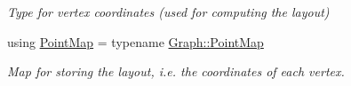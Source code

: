 \begin{DoxyCompactItemize}
\begin{DoxyCompactList}\small\item\em Type for vertex coordinates (used for computing the layout) \end{DoxyCompactList}\item 
using \hyperlink{structDrawer_aab5295b2d9eedf3bab3cb4829cdcfb11}{Point\+Map} = typename \hyperlink{structStateGraph_a21b31bbe893554826be5aee67ef0cab9}{Graph\+::\+Point\+Map}\hypertarget{structDrawer_aab5295b2d9eedf3bab3cb4829cdcfb11}{}\label{structDrawer_aab5295b2d9eedf3bab3cb4829cdcfb11}

\begin{DoxyCompactList}\small\item\em Map for storing the layout, i.\+e. the coordinates of each vertex. \end{DoxyCompactList}\end{DoxyCompactItemize}
